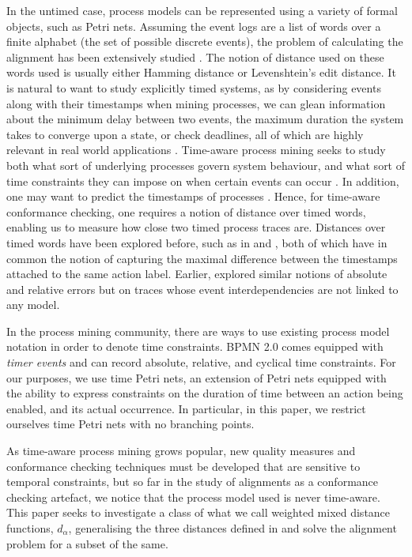 \documentclass[runningheads]{llncs}
\begin{document}
	In the untimed case, process models can be represented using a variety of formal objects, such as Petri nets. 
	Assuming the event logs are a list of words over a finite alphabet (the set of possible discrete events), the problem of calculating the alignment has been extensively studied \cite{Adriansyah2014AligningOA} \cite{BCC21}. 
	The notion of distance used on these words used is usually either Hamming distance or Levenshtein's edit distance. 
	It is natural to want to study explicitly timed systems,
	as by considering events along with their timestamps when mining processes, we can glean information about the minimum delay between two events, the maximum duration the system takes to converge upon a state, or check deadlines, all of which are highly relevant in real world applications \cite{Cheikhrouhou2014TheTP} \cite{Eder1999TimeCI} \cite{inbook}. 
	Time-aware process mining seeks to study both what sort of underlying processes govern system behaviour, and what sort of time constraints they can impose on when certain events can occur \cite{RMAW13} \cite{CRHA20}  \cite{AS21}. 
	In addition, one may want to predict the timestamps of processes \cite{SSA11}. 
	Hence, for time-aware conformance checking, one requires a notion of distance over timed words, enabling us to measure how close two timed process traces are. 
Distances over timed words have been explored before, such as in \cite{ABD18} and \cite{CJM14}, both of which have in common the notion of capturing the maximal difference between the timestamps attached to the same action label. 
Earlier, \cite{GHJ97} explored similar notions of absolute and relative errors but on traces whose event interdependencies are not linked to any model. 


	In the process mining community, there are ways to use existing process model notation in order to denote time constraints. BPMN 2.0 comes equipped with \emph{timer events} and can record absolute, relative, and cyclical time constraints. 
	For our purposes, we use time Petri nets, an extension of Petri nets equipped with the ability to express constraints on the duration of time between an action being enabled, and its actual occurrence. In particular, in this paper, we restrict ourselves time Petri nets with no branching points. 
	
	As time-aware process mining grows popular, new quality measures and conformance checking techniques must be developed that are sensitive to temporal constraints, but so far in the study of alignments as a conformance checking artefact, we notice that the process model used is never time-aware. 
	This paper seeks to investigate a class of what we call weighted mixed distance functions, $d_{\alpha}$, generalising the three distances defined in \cite{CR22} and solve the alignment problem for a subset of the same. 
	
\end{document}
